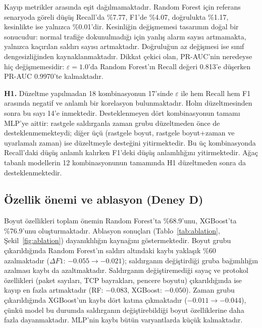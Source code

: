 \documentclass[conference]{IEEEtran}
\begin{document}
Kayıp metrikler arasında eşit dağılmamaktadır. Random Forest için referans senaryoda göreli düşüş Recall'da \%7.77, F1'de \%4.07, doğrulukta \%1.17, kesinlikte ise yalnızca \%0.01'dir. Kesinliğin değişmemesi tasarımın doğal bir sonucudur: normal trafiğe dokunulmadığı için yanlış alarm sayısı artmamakta, yalnızca kaçırılan saldırı sayısı artmaktadır. Doğruluğun az değişmesi ise sınıf dengesizliğinden kaynaklanmaktadır. Dikkat çekici olan, PR-AUC'nin neredeyse hiç değişmemesidir: $\varepsilon=1.0$'da Random Forest'ın Recall değeri 0.813'e düşerken PR-AUC 0.9970'te kalmaktadır.

\textbf{H1.} Düzeltme yapılmadan 18 kombinasyonun 17'sinde $\varepsilon$ ile hem Recall hem F1 arasında negatif ve anlamlı bir korelasyon bulunmaktadır. Holm düzeltmesinden sonra bu sayı 14'e inmektedir. Desteklenmeyen dört kombinasyonun tamamı MLP'ye aittir: rastgele saldırganla zaman grubu düzeltmeden önce de desteklenmemekteydi; diğer üçü (rastgele boyut, rastgele boyut+zaman ve uyarlamalı zaman) ise düzeltmeyle desteğini yitirmektedir. Bu üç kombinasyonda Recall'daki düşüş anlamlı kalırken F1'deki düşüş anlamlılığını yitirmektedir. Ağaç tabanlı modellerin 12 kombinasyonunun tamamında H1 düzeltmeden sonra da desteklenmektedir.

\subsection{Özellik önemi ve ablasyon (Deney D)}
Boyut özellikleri toplam önemin Random Forest'ta \%68.9'unu, XGBoost'ta \%76.9'unu oluşturmaktadır. Ablasyon sonuçları (Tablo~\ref{tab:ablation}, Şekil~\ref{fig:ablation}) dayanıklılığın kaynağını göstermektedir. Boyut grubu çıkarıldığında Random Forest'ın saldırı altındaki kaybı yaklaşık \%60 azalmaktadır ($\Delta F1$: $-0.055 \rightarrow -0.021$); saldırganın değiştirdiği gruba bağımlılığın azalması kaybı da azaltmaktadır. Saldırganın değiştiremediği sayaç ve protokol özellikleri (paket sayıları, TCP bayrakları, pencere boyutu) çıkarıldığında ise kayıp en fazla artmaktadır (RF: $-0.083$, XGBoost: $-0.050$). Zaman grubu çıkarıldığında XGBoost'un kaybı dört katına çıkmaktadır ($-0.011 \rightarrow -0.044$), çünkü model bu durumda saldırganın değiştirebildiği boyut özelliklerine daha fazla dayanmaktadır. MLP'nin kaybı bütün varyantlarda küçük kalmaktadır.
\end{document}

